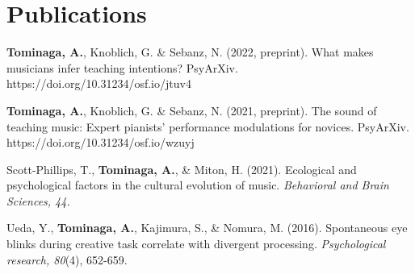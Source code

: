 \documentclass[letterpaper,11pt]{article}
\begin{document}
\section{Publications}
 \begin{itemize}[leftmargin=0.15in, label={}]
    \small{
      \item{
      \textbf{Tominaga, A.}, Knoblich, G. \& Sebanz, N. (2022, preprint). What makes musicians infer teaching intentions? PsyArXiv. https://doi.org/10.31234/osf.io/jtuv4
      }
      \item{
      \textbf{Tominaga, A.}, Knoblich, G. \& Sebanz, N. (2021, preprint). The sound of teaching music: Expert pianists' performance modulations for novices. PsyArXiv. https://doi.org/10.31234/osf.io/wzuyj
      }
      \item{
      Scott-Phillips, T., \textbf{Tominaga, A.}, \& Miton, H. (2021). Ecological and psychological factors in the cultural evolution of music. \textit{Behavioral and Brain Sciences, 44.}
      }
      \item{
      Ueda, Y., \textbf{Tominaga, A.}, Kajimura, S., \& Nomura, M. (2016). Spontaneous eye blinks during creative task correlate with divergent processing. \textit{Psychological research, 80}(4), 652-659.
      }}
 \end{itemize}

\end{document}
